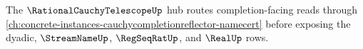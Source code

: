 The $\RationalCauchyTelescopeUp$ hub routes completion-facing reads through \autoref{ch:concrete-instances-cauchycompletionreflector-namecert} before exposing the dyadic, $\StreamNameUp$, $\RegSeqRatUp$, and $\RealUp$ rows.


